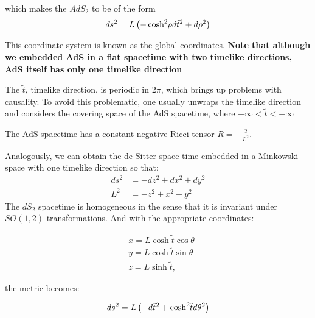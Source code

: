 \documentclass[12pt]{article}
\begin{document}
which makes the \( AdS_2 \) to be of the form
\begin{equation}
    ds^2 = L \left( -\cosh^2{ \hspace{-2pt}\rho } d\tilde{t}^2 + d\rho^2 \right)
\end{equation}

This coordinate system is known as the global coordinates. \textbf{Note that although we embedded AdS in a flat spacetime with two timelike directions, AdS itself has only one timelike direction}

\vspace{0.5cm}

The \( \tilde{t} \), timelike direction, is periodic in \( 2\pi \), which brings up problems with causality. To avoid this problematic, one usually unwraps the timelike direction and considers the covering space of the AdS spacetime, where \( -\infty < \tilde{t} < +\infty \) 

\vspace{0.5cm}

The AdS spacetime has a constant negative Ricci tensor \( R = -\frac{2}{L^2} \).

Analogously, we can obtain the de Sitter space time embedded in a Minkowski space with one timelike direction so that:
\begin{equation}
\begin{aligned}
    ds^2 &= -dz^2 + dx^2 + dy^2 \\
    L^2 &= -z^2 + x^2 + y^2
\end{aligned}
\end{equation}
The \( dS_2 \) spacetime is homogeneous in the sense that it is invariant under \( SO(1,2) \) transformations. And with the appropriate coordinates:

\begin{equation}
\begin{aligned}
    & x = L \cosh{ \tilde{t} } \cos{ \theta } \\
    & y = L \cosh{ \tilde{t} } \sin{ \theta } \\
    & z = L \sinh{ \tilde{t} },
\end{aligned}
\end{equation}

the metric becomes:

\begin{equation}
    ds^2 = L \left( - d\tilde{t}^2 + \cosh^2{ \hspace{-2pt}\tilde{t} }d\theta^2 \right)
\end{equation}
\end{document}
